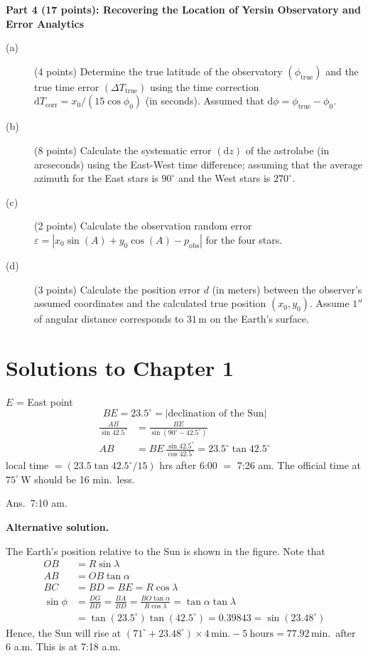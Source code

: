 \medskip\noindent\textbf{Part 4 (17 points): Recovering the Location of Yersin Observatory and Error Analytics}

\begin{description}
\item[(a)] (4 points) Determine the true latitude of the observatory
  $(\phi_{\mathrm{true}})$ and the true time error $(\Delta T_{\mathrm{true}})$
  using the time correction $\mathrm{d}T_{\mathrm{corr}} = x_0/(15\cos\phi_0)$
  (in seconds). Assumed that $\mathrm{d}\phi = \phi_{\mathrm{true}} - \phi_0$.
\item[(b)] (8 points) Calculate the systematic error $(\mathrm{d}z)$ of the
  astrolabe (in arcseconds) using the East-West time difference; assuming that
  the average azimuth for the East stars is $90^\circ$ and the West stars is
  $270^\circ$.
\item[(c)] (2 points) Calculate the observation random error
  $\varepsilon = |x_0\sin(A) + y_0\cos(A) - p_{\mathrm{obs}}|$ for the four
  stars.
\item[(d)] (3 points) Calculate the position error $d$ (in meters) between the
  observer's assumed coordinates and the calculated true position
  $(x_0, y_0)$. Assume $1''$ of angular distance corresponds to
  $31\,\mathrm{m}$ on the Earth's surface.
\end{description}

\clearpage
\section*{Solutions to Chapter 1}

$E$ = East point
\[
  BE = 23.5^\circ = |\text{declination of the Sun}|
\]
\begin{align*}
  \frac{AB}{\sin 42.5^\circ} &= \frac{BE}{\sin\left(90^\circ - 42.5^\circ\right)} \\
  AB &= BE\,\frac{\sin 42.5^\circ}{\cos 42.5^\circ} = 23.5^\circ \tan 42.5^\circ
\end{align*}
local time $= (23.5 \tan 42.5^\circ / 15)$ hrs after 6:00 $=$ 7:26 am. The
official time at $75^\circ$\,W should be 16 min.\ less.

Ans.\ 7:10 am.

\medskip
\noindent\textbf{Alternative solution.}

The Earth's position relative to the Sun is shown in the figure. Note that
\begin{align*}
  OB &= R\sin\lambda \\
  AB &= OB\tan\alpha \\
  BC &= BD = BE = R\cos\lambda \\
  \sin\phi &= \frac{DG}{BD} = \frac{BA}{BD}
    = \frac{BO\tan\alpha}{R\cos\lambda} = \tan\alpha\tan\lambda \\
  &= \tan\left(23.5^\circ\right)\tan\left(42.5^\circ\right)
    = 0.39843 = \sin(23.48^\circ)
\end{align*}
Hence, the Sun will rise at
$\left(71^\circ + 23.48^\circ\right) \times 4\,\text{min.} - 5\ \text{hours}
= 77.92$\,min.\ after 6 a.m. This is at 7:18 a.m.

